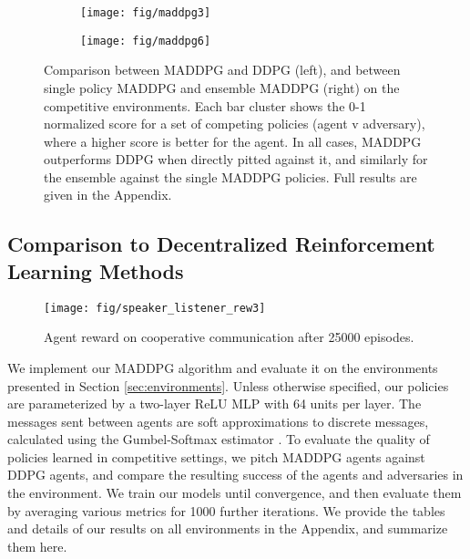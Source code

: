 \documentclass{article}
\newcommand{\hide}[1]{}
\begin{document}


\begin{figure}
\begin{subfigure}{.52\textwidth}
  \centering
  \texttt{[image: fig/maddpg3]}
\end{subfigure}
\hspace{1mm}
\begin{subfigure}{.48\textwidth}
  \centering
  \texttt{[image: fig/maddpg6]}
\end{subfigure}
\vspace{-2mm}
\caption{Comparison between MADDPG and DDPG (left), and between single policy MADDPG and ensemble MADDPG (right) on the competitive environments. Each bar cluster shows the 0-1 normalized score for a set of competing policies (agent v adversary), where a higher score is better for the agent. In all cases, MADDPG outperforms DDPG when directly pitted against it, and similarly for the ensemble against the single MADDPG policies. Full results are given in the Appendix. \vspace{-3mm}}\label{fig:adv}
\end{figure}



\subsection{Comparison to Decentralized Reinforcement Learning Methods}
\label{sec:maddpgexperiments}

\begin{wrapfigure}{r}{0.5\textwidth}
\vspace{-6mm}
\texttt{[image: fig/speaker\_listener\_rew3]}

\caption{\label{fig:comm_curves} Agent reward on cooperative communication after 25000 episodes. \vspace{-3mm}}
\end{wrapfigure}
We implement our MADDPG algorithm and evaluate it on the environments presented in Section \ref{sec:environments}. Unless otherwise specified, our policies are parameterized by a two-layer ReLU MLP with 64 units per layer. 
The messages sent between agents are soft approximations to discrete messages, calculated using the Gumbel-Softmax estimator \cite{jang2016categorical}. 
To evaluate the quality of policies learned in competitive settings, we pitch MADDPG agents against DDPG agents, and compare the resulting success of the agents and adversaries in the environment. We train our models until convergence, and then evaluate them by averaging various metrics for 1000 further iterations. 
We provide the tables and details of our results on all environments in the Appendix, and summarize them here. \hide{ (including hyperparameters)}
\end{document}
